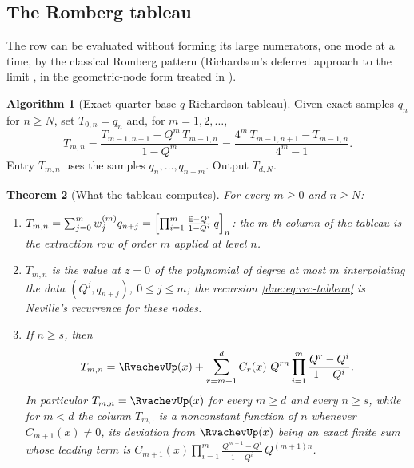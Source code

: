 \documentclass[11pt,oneside]{article}
\theoremstyle{plain}
\newtheorem{theorem}{Theorem}[section]
\theoremstyle{definition}
\newtheorem{algorithm}[theorem]{Algorithm}
\theoremstyle{remark}
\newcommand{\upn}[1]{\RvachevUp_{#1}}
\newcommand{\Qq}{Q}                                         %
\newcommand{\Cr}[2]{C_{#1}\!\left(#2\right)}                %
\newcommand{\qn}[1]{q_{#1}}                                 %
\newcommand{\Wrow}[2]{w^{(#1)}_{#2}}                        %
\begin{document}
\subsection{The Romberg tableau}

The row can be evaluated without forming its large numerators, one mode at a
time, by the classical Romberg pattern (Richardson's deferred approach to the
limit \cite{richardson1911}, in the geometric-node form treated in
\cite{brezinski-redivo-zaglia}).

\begin{algorithm}[Exact quarter-base $q$-Richardson tableau]
\label{due:alg:rec-tableau}
Given exact samples $\qn{n}$ for $n\ge N$, set $T_{0,n}=\qn{n}$ and, for
$m=1,2,\ldots$,
\begin{equation}
 \boxed{\;
 T_{m,n}=\frac{T_{m-1,n+1}-\Qq^{m}\,T_{m-1,n}}{1-\Qq^{m}}
 =\frac{4^{m}\,T_{m-1,n+1}-T_{m-1,n}}{4^{m}-1}.\;}
 \label{due:eq:rec-tableau}
\end{equation}
Entry $T_{m,n}$ uses the samples $\qn{n},\ldots,\qn{n+m}$.  Output $T_{d,N}$.
\end{algorithm}

\begin{theorem}[What the tableau computes]
\label{due:thm:rec-tableau}
For every $m\ge0$ and $n\ge N$:
\begin{enumerate}
\item\label{due:it:rec-tab-row}
 $T_{m,n}=\sum_{j=0}^{m}\Wrow{m}{j}\qn{n+j}
 =\Bigl[\prod_{i=1}^{m}\frac{\mathsf E-\Qq^{i}}{1-\Qq^{i}}\,q\Bigr]_{n}$: the
 $m$-th column of the tableau is the extraction row of order $m$ applied at
 level $n$.
\item\label{due:it:rec-tab-neville}
 $T_{m,n}$ is the value at $z=0$ of the polynomial of degree at most $m$
 interpolating the data $(\Qq^{j},\qn{n+j})$, $0\le j\le m$; the recursion
 \cref{due:eq:rec-tableau} is Neville's recurrence for these nodes.
\item\label{due:it:rec-tab-modes}
 If $n\ge s$, then
 \begin{equation}
  T_{m,n}=\RvachevUp(x)+\sum_{r=m+1}^{d}\Cr{r}{x}\,\Qq^{rn}
  \prod_{i=1}^{m}\frac{\Qq^{r}-\Qq^{i}}{1-\Qq^{i}}.
  \label{due:eq:rec-tableau-modes}
 \end{equation}
 In particular $T_{m,n}=\RvachevUp(x)$ for every $m\ge d$ and every $n\ge s$,
 while for $m<d$ the column $T_{m,\cdot}$ is a nonconstant function of $n$
 whenever $\Cr{m+1}{x}\ne0$, its deviation from $\RvachevUp(x)$ being an
 exact finite sum whose leading term is
 $\Cr{m+1}{x}\prod_{i=1}^{m}\frac{\Qq^{m+1}-\Qq^{i}}{1-\Qq^{i}}\,\Qq^{(m+1)n}$.
\end{enumerate}
\end{theorem}
\end{document}
